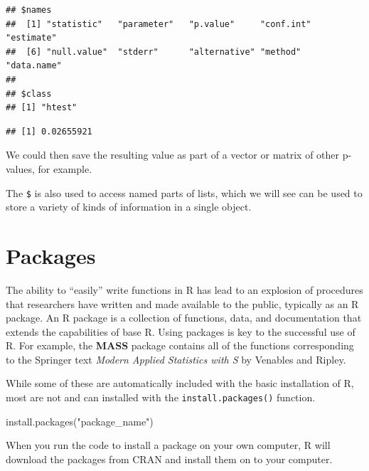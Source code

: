 \documentclass[
]{book}
\newenvironment{Shaded}{\begin{snugshade}}{\end{snugshade}}
\newcommand{\FunctionTok}[1]{\textcolor[rgb]{0.00,0.00,0.00}{#1}}
\newcommand{\NormalTok}[1]{#1}
\newcommand{\SpecialCharTok}[1]{\textcolor[rgb]{0.00,0.00,0.00}{#1}}
\newcommand{\StringTok}[1]{\textcolor[rgb]{0.31,0.60,0.02}{#1}}
\begin{document}
\begin{verbatim}
## $names
##  [1] "statistic"   "parameter"   "p.value"     "conf.int"    "estimate"   
##  [6] "null.value"  "stderr"      "alternative" "method"      "data.name"  
## 
## $class
## [1] "htest"
\end{verbatim}

\begin{Shaded}
\end{Shaded}

\begin{verbatim}
## [1] 0.02655921
\end{verbatim}

We could then save the resulting value as part of a vector or matrix of other p-values, for example.

The \texttt{\$} is also used to access named parts of lists, which we will see can be used to store a variety of kinds of information in a single object.

\hypertarget{packages}{%
\section{Packages}\label{packages}}

The ability to ``easily'' write functions in R has lead to an explosion of procedures that researchers have written and made available to the public, typically as an R package. An R package is a collection of functions, data, and documentation that extends the capabilities of base R. Using packages is key to the successful use of R. For example, the \textbf{MASS} package contains all of the functions corresponding to the Springer text \emph{Modern Applied Statistics with S} by Venables and Ripley.

While some of these are automatically included with the basic installation of R, most are not and can installed with the \texttt{install.packages()} function.

\begin{Shaded}
\begin{Highlighting}[]
\FunctionTok{install.packages}\NormalTok{(}\StringTok{"package\_name"}\NormalTok{)}
\end{Highlighting}
\end{Shaded}

When you run the code to install a package on your own computer, R will download the packages from CRAN and install them on to your computer.
\end{document}
